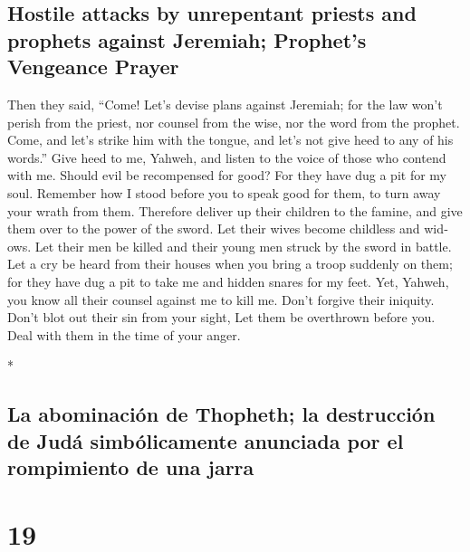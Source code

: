 \begin{paracol}{2}
\begin{otherlanguage}{english}
\hypertarget{hostile-attacks-by-unrepentant-priests-and-prophets-against-jeremiah-prophets-vengeance-prayer}{%
\subsection{Hostile attacks by unrepentant priests and prophets against
Jeremiah; Prophet's Vengeance
Prayer}\label{hostile-attacks-by-unrepentant-priests-and-prophets-against-jeremiah-prophets-vengeance-prayer}}

 Then they said, ``Come! Let's devise plans against
Jeremiah; for the law won't perish from the priest, nor counsel from the
wise, nor the word from the prophet. Come, and let's strike him with the
tongue, and let's not give heed to any of his words.'' 
Give heed to me, Yahweh, and listen to the voice of those who contend
with me.  Should evil be recompensed for good? For they
have dug a pit for my soul. Remember how I stood before you to speak
good for them, to turn away your wrath from them. 
Therefore deliver up their children to the famine, and give them over to
the power of the sword. Let their wives become childless and widows. Let
their men be killed and their young men struck by the sword in battle.
 Let a cry be heard from their houses when you bring a
troop suddenly on them; for they have dug a pit to take me and hidden
snares for my feet.  Yet, Yahweh, you know all their
counsel against me to kill me. Don't forgive their iniquity. Don't blot
out their sin from your sight, Let them be overthrown before you. Deal
with them in the time of your anger.

\end{otherlanguage}

\switchcolumn[0]*

\hypertarget{la-abominaciuxf3n-de-thopheth-la-destrucciuxf3n-de-juduxe1-simbuxf3licamente-anunciada-por-el-rompimiento-de-una-jarra}{%
\subsection{La abominación de Thopheth; la destrucción de Judá
simbólicamente anunciada por el rompimiento de una
jarra}\label{la-abominaciuxf3n-de-thopheth-la-destrucciuxf3n-de-juduxe1-simbuxf3licamente-anunciada-por-el-rompimiento-de-una-jarra}}

\hypertarget{section-36}{%
\section{19}\label{section-36}}


\end{paracol}
